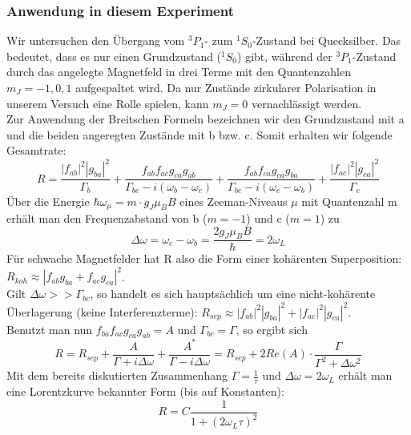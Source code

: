 \subsubsection{Anwendung in diesem Experiment}
Wir untersuchen den Übergang vom $^{3}P_{1}$- zum $^{1}S_{0}$-Zustand bei Quecksilber. Das bedeutet, dass es nur einen Grundzustand ($^{1}S_{0}$) gibt, während der $^{3}P_{1}$-Zustand durch das angelegte Magnetfeld in drei Terme mit den Quantenzahlen $m_{J}=-1,0,1$ aufgespaltet wird. Da nur Zustände zirkularer Polarisation in unserem Versuch eine Rolle spielen, kann $m_{J}=0$ vernachlässigt werden. \\
Zur Anwendung der Breitschen Formeln bezeichnen wir den Grundzustand mit a und die beiden angeregten Zustände mit b bzw. c. Somit erhalten wir folgende Gesamtrate: \[R=\frac{\left|f_{ab}\right|^{2}\left|g_{ba}\right|^{2}}{\Gamma_{b}}+\frac{f_{ab}f_{ac}g_{ca}g_{ab}}{\Gamma_{bc}-i(\omega_{b}-\omega_{c})}+\frac{f_{ab}f_{ca}g_{ca}g_{ba}}{\Gamma_{bc}-i(\omega_{c}-\omega_{b})}+\frac{\left|f_{ac}\right|^{2}\left|g_{ca}\right|^{2}}{\Gamma_{c}}\]
Über die Energie $\hbar\omega_{\mu}=m\cdot g_{J}\mu_{B}B$ eines Zeeman-Niveaus $\mu$ mit Quantenzahl m erhält man den Frequenzabstand von b ($m=-1$) und c ($m=1$) zu \[\Delta\omega=\omega_{c}-\omega_{b}=\frac{2g_{J}\mu_{B}B}{\hbar}=2\omega_{L}\]
Für schwache Magnetfelder hat R also die Form einer kohärenten Superposition: $R_{koh}\approx\left|f_{ab}g_{ba}+f_{ac}g_{ca}\right|^{2}$.\\
Gilt $\Delta\omega>>\Gamma_{bc}$, so handelt es sich hauptsächlich um eine nicht-kohärente Überlagerung (keine Interferenzterme): $R_{sep}\approx\left|f_{ab}\right|^{2}\left|g_{ba}\right|^{2}+\left|f_{ac}\right|^{2}\left|g_{ca}\right|^{2}$. \\
Benutzt man nun $f_{ba}f_{ac}g_{ca}g_{ab}=A$ und $\Gamma_{bc}=\Gamma$, so ergibt sich \[R=R_{sep}+\frac{A}{\Gamma+i\Delta\omega}+\frac{A^{\ast}}{\Gamma-i\Delta\omega}=R_{sep}+2Re(A)\cdot\frac{\Gamma}{\Gamma^{2}+\Delta\omega^{2}}\]
Mit dem bereits diskutierten Zusammenhang $\Gamma=\frac{1}{\tau}$ und $\Delta\omega=2\omega_{L}$ erhält man eine Lorentzkurve bekannter Form (bis auf Konstanten): \[R=C\frac{1}{1+(2\omega_{L}\tau)^{2}}\] 
\clearpage

